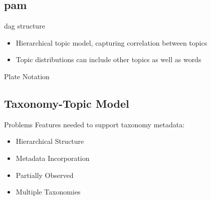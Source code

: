\subsection{\acrlong{pam}}

\begin{frame}{\insertsubsection}{\gls{dag} structure}
    \begin{itemize}
    	\item<1-> Hierarchical topic model, capturing correlation between topics
    	\item<2-> Topic distributions can include other topics as well as words
    \end{itemize}
	
\end{frame}

\begin{frame}{\insertsubsection}{Plate Notation}
	\begin{figure}
			\centering
			\resizebox{0.45\columnwidth}{!}{%
			
			}
	\end{figure}
\end{frame}

\subsection{Taxonomy-Topic Model}

\begin{frame}{\insertsubsection}{Problems}
	Features needed to support taxonomy metadata:
	\begin{itemize}
		\item<1-> Hierarchical Structure
		\item<2-> Metadata Incorporation
		\item<3-> Partially Observed
		\item<4-> Multiple Taxonomies
	\end{itemize}
\end{frame}

